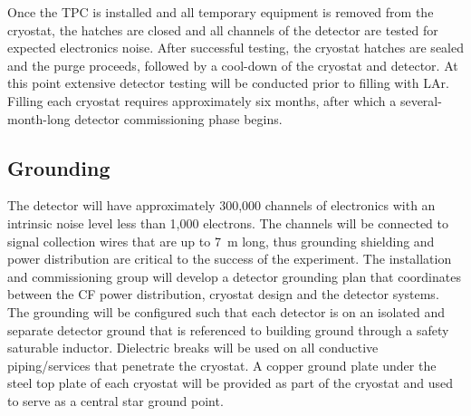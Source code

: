Once the TPC is installed and all temporary equipment is removed from
the cryostat, the hatches are closed and all channels of the
detector are tested for expected electronics noise. After
successful testing, the cryostat hatches are sealed and the purge
proceeds, followed by a cool-down of the cryostat and detector.
At this point extensive detector testing will be conducted prior to 
filling with LAr. Filling each  cryostat 
requires approximately six months, after which a several-month-long
detector commissioning phase begins.

\subsection{Grounding}
\label{sec:detectors-fd-ref-install-ground}

The detector will have approximately 300,000 channels of electronics with
an intrinsic noise level less than 1,000 electrons. The channels will
be connected to signal collection wires that are up to 7~m long, thus
grounding shielding  and power distribution are critical to the success
of the experiment.
The installation and commissioning group will develop a detector
grounding plan that coordinates between the CF
power distribution, cryostat design and the detector systems.   The grounding will be configured such that each
detector is on an isolated and separate detector ground that is
referenced to building ground through a safety saturable inductor.
Dielectric breaks will be used on all conductive piping/services that
penetrate the cryostat.  A copper ground plate under the steel top
plate of each cryostat will be provided as part of the cryostat and
used to serve as a central star ground point.


